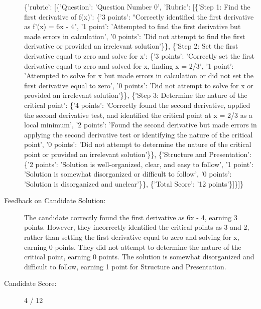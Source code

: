 \documentclass{article}%
\begin{document}
\begin{description}
\{'rubric': {[}\{'Question': 'Question Number 0', 'Rubric': {[}\{'Step 1: Find the first derivative of f(x)': \{'3 points': "Correctly identified the first derivative as f'(x) = 6x {-} 4", '1 point': 'Attempted to find the first derivative but made errors in calculation', '0 points': 'Did not attempt to find the first derivative or provided an irrelevant solution'\}\}, \{'Step 2: Set the first derivative equal to zero and solve for x': \{'3 points': 'Correctly set the first derivative equal to zero and solved for x, finding x = 2/3', '1 point': 'Attempted to solve for x but made errors in calculation or did not set the first derivative equal to zero', '0 points': 'Did not attempt to solve for x or provided an irrelevant solution'\}\}, \{'Step 3: Determine the nature of the critical point': \{'4 points': 'Correctly found the second derivative, applied the second derivative test, and identified the critical point at x = 2/3 as a local minimum', '2 points': 'Found the second derivative but made errors in applying the second derivative test or identifying the nature of the critical point', '0 points': 'Did not attempt to determine the nature of the critical point or provided an irrelevant solution'\}\}, \{'Structure and Presentation': \{'2 points': 'Solution is well{-}organized, clear, and easy to follow', '1 point': 'Solution is somewhat disorganized or difficult to follow', '0 points': 'Solution is disorganized and unclear'\}\}, \{'Total Score': '12 points'\}{]}\}{]}\}%
\item[Feedback on Candidate Solution: ]%
The candidate correctly found the first derivative as 6x {-} 4, earning 3 points. However, they incorrectly identified the critical points as 3 and 2, rather than setting the first derivative equal to zero and solving for x, earning 0 points. They did not attempt to determine the nature of the critical point, earning 0 points. The solution is somewhat disorganized and difficult to follow, earning 1 point for Structure and Presentation.%
\item[Candidate Score: ]%
4 / 12%
\end{description}%
\end{document}
